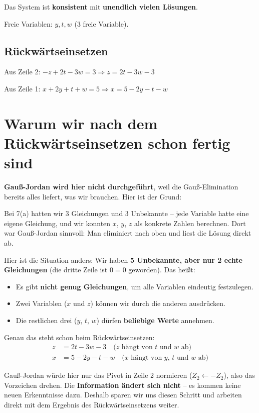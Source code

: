 \documentclass[a4paper,12pt]{article}
\begin{document}
Das System ist \textbf{konsistent} mit \textbf{unendlich vielen Lösungen}.

Freie Variablen: $y, t, w$ (3 freie Variable).

\subsection*{Rückwärtseinsetzen}

Aus Zeile 2: $-z + 2t - 3w = 3 \Rightarrow z = 2t - 3w - 3$

Aus Zeile 1: $x + 2y + t + w = 5 \Rightarrow x = 5 - 2y - t - w$

\section*{Warum wir nach dem Rückwärtseinsetzen schon fertig sind}

\textbf{Gauß-Jordan wird hier nicht durchgeführt}, weil die Gauß-Elimination
bereits alles liefert, was wir brauchen. Hier ist der Grund:

Bei 7(a) hatten wir 3 Gleichungen und 3 Unbekannte -- jede Variable hatte
eine \glqq eigene\grqq{} Gleichung, und wir konnten $x$, $y$, $z$ als konkrete Zahlen berechnen.
Dort war Gauß-Jordan sinnvoll: Man eliminiert nach oben und liest die Lösung direkt ab.

Hier ist die Situation anders: Wir haben \textbf{5 Unbekannte, aber nur 2 echte Gleichungen}
(die dritte Zeile ist $0 = 0$ geworden). Das heißt:
\begin{itemize}
\item Es gibt \textbf{nicht genug Gleichungen}, um alle Variablen eindeutig festzulegen.
\item Zwei Variablen ($x$ und $z$) können wir durch die anderen ausdrücken.
\item Die restlichen drei ($y$, $t$, $w$) dürfen \textbf{beliebige Werte} annehmen.
\end{itemize}

Genau das steht schon beim Rückwärtseinsetzen:
\begin{align*}
z &= 2t - 3w - 3 \quad \text{($z$ hängt von $t$ und $w$ ab)} \\
x &= 5 - 2y - t - w \quad \text{($x$ hängt von $y$, $t$ und $w$ ab)}
\end{align*}

Gauß-Jordan würde hier nur das Pivot in Zeile 2 normieren ($Z_2 \leftarrow -Z_2$), also das
Vorzeichen drehen. Die \textbf{Information ändert sich nicht} -- es kommen keine neuen
Erkenntnisse dazu. Deshalb sparen wir uns diesen Schritt und arbeiten direkt
mit dem Ergebnis des Rückwärtseinsetzens weiter.
\end{document}
